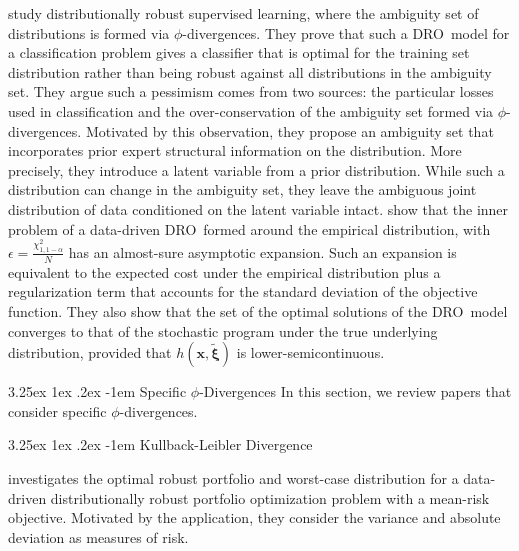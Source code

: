 \documentclass[final,onefignum,onetabnum]{class}
\makeatletter
\renewcommand\paragraph{\@startsection{paragraph}{4}{\z@}%
  {3.25ex \@plus1ex \@minus.2ex}%
  {-1em}%
  {\normalfont\normalsize\bfseries}}
\renewcommand\subparagraph{\@startsection{subparagraph}{5}{\parindent}%
  {3.25ex \@plus1ex \@minus .2ex}%
  {-1em}%
  {\normalfont\normalsize\bfseries}}
\newcommand{\bs}[1]{\boldsymbol{#1}} %
\newcommand{\txi}{\tilde{\bs{\xi}}}
\newcommand{\dro}{DRO}
\makeatother
\begin{document}
\citet{hu2018} study distributionally robust supervised learning, where the ambiguity set of distributions is formed via $\phi$-divergences. They prove that such a \dro\ model for a classification   problem gives a  classifier that is optimal for the  training set distribution rather than being robust against all distributions in the ambiguity set. They argue such a pessimism  comes from two sources: the particular
losses used in classification and the over-conservation
of the ambiguity set formed via  $\phi$-divergences. Motivated by this observation, they propose an ambiguity set that incorporates prior expert structural information on the distribution. More precisely, they introduce a latent variable from a prior distribution. While such a distribution can change in the ambiguity set, they leave the ambiguous joint distribution of data conditioned on the latent variable intact.   
\citet{duchi2016} show that the inner problem of  a data-driven \dro\ formed around the empirical distribution, with $\epsilon=\frac{\chi^{2}_{1, 1-\alpha}}{N}$ has an almost-sure asymptotic expansion. Such an expansion is equivalent to the expected cost under the empirical distribution plus  a regularization term that accounts for the standard deviation of the objective function. They also show that the set of the optimal solutions of the \dro\ model converges to that of the stochastic program under the true underlying distribution, provided that $h(\bs{x},\txi)$ is lower-semicontinuous. 

\paragraph{Specific $\phi$-Divergences}
In this section, we review papers that consider specific $\phi$-divergences. 

\subparagraph{Kullback-Leibler Divergence} 


\citet{calafiore2007} investigates the optimal robust portfolio and worst-case distribution for a data-driven distributionally robust portfolio optimization problem with a mean-risk objective. Motivated by the application, they consider the variance and absolute deviation as measures of risk.
\end{document}
